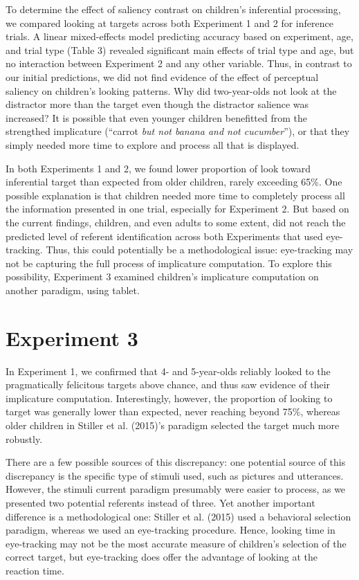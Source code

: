 \documentclass[a4paper,man,apacite,floatsintext]{apa6}
\begin{document}
To determine the effect of saliency contrast on children's inferential
processing, we compared looking at targets across both Experiment 1 and
2 for inference trials. A linear mixed-effects model predicting accuracy
based on experiment, age, and trial type (Table 3) revealed significant
main effects of trial type and age, but no interaction between
Experiment 2 and any other variable. Thus, in contrast to our initial
predictions, we did not find evidence of the effect of perceptual
saliency on children's looking patterns. Why did two-year-olds not look
at the distractor more than the target even though the distractor
salience was increased? It is possible that even younger children
benefitted from the strengthed implicature (``carrot \emph{but not
banana and not cucumber}''), or that they simply needed more time to
explore and process all that is displayed.

In both Experiments 1 and 2, we found lower proportion of look toward
inferential target than expected from older children, rarely exceeding
65\%. One possible explanation is that children needed more time to
completely process all the information presented in one trial,
especially for Experiment 2. But based on the current findings,
children, and even adults to some extent, did not reach the predicted
level of referent identification across both Experiments that used
eye-tracking. Thus, this could potentially be a methodological issue:
eye-tracking may not be capturing the full process of implicature
computation. To explore this possibility, Experiment 3 examined
children's implicature computation on another paradigm, using tablet.

\section{Experiment 3}\label{experiment-3}

In Experiment 1, we confirmed that 4- and 5-year-olds reliably looked to
the pragmatically felicitous targets above chance, and thus saw evidence
of their implicature computation. Interestingly, however, the proportion
of looking to target was generally lower than expected, never reaching
beyond 75\%, whereas older children in Stiller et al. (2015)'s paradigm
selected the target much more robustly.

There are a few possible sources of this discrepancy: one potential
source of this discrepancy is the specific type of stimuli used, such as
pictures and utterances. However, the stimuli current paradigm
presumably were easier to process, as we presented two potential
referents instead of three. Yet another important difference is a
methodological one: Stiller et al. (2015) used a behavioral selection
paradigm, whereas we used an eye-tracking procedure. Hence, looking time
in eye-tracking may not be the most accurate measure of children's
selection of the correct target, but eye-tracking does offer the
advantage of looking at the reaction time.
\end{document}
